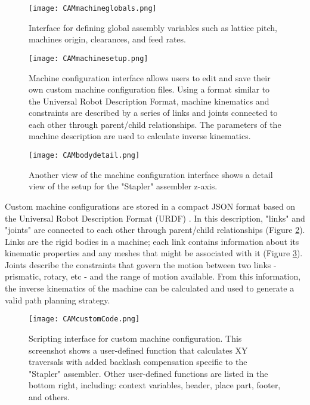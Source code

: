 {\begin{figure}
  \texttt{[image: CAMmachineglobals.png]}
  \caption{Interface for defining global assembly variables such as lattice pitch, machines origin, clearances, and feed rates.}
  \label{fig:CAMmachineglobals}
\end{figure}


\begin{figure}
  \texttt{[image: CAMmachinesetup.png]}
  \caption{Machine configuration interface allows users to edit and save their own custom machine configuration files.  Using a format similar to the Universal Robot Description Format, machine kinematics and constraints are described by a series of links and joints connected to each other through parent/child relationships.  The parameters of the machine description are used to calculate inverse kinematics.}
  \label{fig:CAMmachinesetup}
\end{figure}

\begin{figure}
  \texttt{[image: CAMbodydetail.png]}
  \caption{Another view of the machine configuration interface shows a detail view of the setup for the "Stapler" assembler z-axis.}
  \label{fig:CAMbodydetail}
\end{figure}


Custom machine configurations are stored in a compact JSON format based on the Universal Robot Description Format (URDF) \cite{ROS2016}.  In this description, "links" and "joints" are connected to each other through parent/child relationships (Figure \ref{fig:CAMmachinesetup}).  Links are the rigid bodies in a machine; each link contains information about its kinematic properties and any meshes that might be associated with it (Figure \ref{fig:CAMbodydetail}).  Joints describe the constraints that govern the motion between two links - prismatic, rotary, etc - and the range of motion available.  From this information, the inverse kinematics of the machine can be calculated and used to generate a valid path planning strategy.\\

\begin{figure}
  \texttt{[image: CAMcustomCode.png]}
  \caption{Scripting interface for custom machine configuration.  This screenshot shows a user-defined function that calculates XY traversals with added backlash compensation specific to the "Stapler" assembler.  Other user-defined functions are listed in the bottom right, including: context variables, header, place part, footer, and others.}
  \label{fig:CAMcustomCode}
\end{figure}

}
